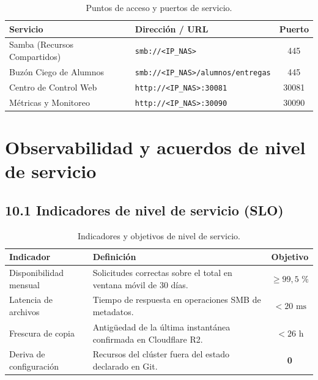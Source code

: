 \documentclass[10pt,a4paper]{article}
\begin{document}
\begin{table}[htbp]
\centering
\small
\caption{Puntos de acceso y puertos de servicio.}
\label{tab:puntos_acceso}
\begin{tabular}{|p{4.5cm}|p{7cm}|c|}
\hline
\textbf{\textsf{Servicio}} & \textbf{\textsf{Dirección / URL}} & \textbf{\textsf{Puerto}} \\
\hline
Samba (Recursos Compartidos) & \texttt{smb://<IP\_NAS>} & 445 \\
\hline
Buzón Ciego de Alumnos & \texttt{smb://<IP\_NAS>/alumnos/entregas} & 445 \\
\hline
Centro de Control Web & \texttt{http://<IP\_NAS>:30081} & 30081 \\
\hline
Métricas y Monitoreo & \texttt{http://<IP\_NAS>:30090} & 30090 \\
\hline
\end{tabular}
\end{table}

\newpage
\section{Observabilidad y acuerdos de nivel de servicio}

\subsection{10.1 Indicadores de nivel de servicio (SLO)}

\begin{table}[htbp]
\centering
\small
\caption{Indicadores y objetivos de nivel de servicio.}
\label{tab:slos}
\begin{tabular}{|p{4cm}|p{7.5cm}|c|}
\hline
\textbf{\textsf{Indicador}} & \textbf{\textsf{Definición}} & \textbf{\textsf{Objetivo}} \\
\hline
Disponibilidad mensual & Solicitudes correctas sobre el total en ventana móvil de 30 días. & $\ge 99,5\text{ \%}$ \\
\hline
Latencia de archivos & Tiempo de respuesta en operaciones SMB de metadatos. & $< 20\text{ ms}$ \\
\hline
Frescura de copia & Antigüedad de la última instantánea confirmada en Cloudflare R2. & $< 26\text{ h}$ \\
\hline
Deriva de configuración & Recursos del clúster fuera del estado declarado en Git. & \textbf{0} \\
\hline
\end{tabular}
\end{table}
\end{document}
